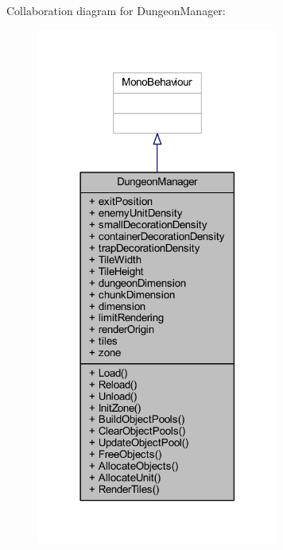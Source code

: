 Collaboration diagram for Dungeon\+Manager\+:
\nopagebreak
\begin{figure}[H]
\begin{center}
\leavevmode
\includegraphics[width=225pt]{class_dungeon_manager__coll__graph}
\end{center}
\end{figure}

